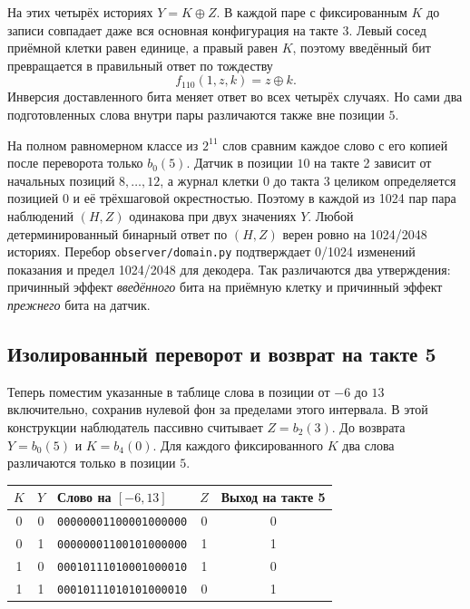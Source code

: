 На этих четырёх историях $Y=K\oplus Z$. В каждой паре с фиксированным $K$
до записи совпадает даже вся основная конфигурация на такте 3.
Левый сосед приёмной клетки равен единице, а правый равен $K$, поэтому
введённый бит превращается в правильный ответ по тождеству
\begin{equation}
 f_{110}(1,z,k)=z\oplus k.
 \label{eq:observer-xor-gate}
\end{equation}
Инверсия доставленного бита меняет ответ во всех четырёх случаях. Но сами
два подготовленных слова внутри пары различаются также вне позиции $5$.

На полном равномерном классе из $2^{11}$ слов сравним каждое слово с его
копией после переворота только $b_0(5)$. Датчик в позиции $10$ на такте 2
зависит от начальных позиций $8,\ldots,12$, а журнал клетки $0$ до такта 3
целиком определяется позицией $0$ и её трёхшаговой окрестностью.
Поэтому в каждой из 1024 пар пара наблюдений $(H,Z)$ одинакова при двух
значениях $Y$. Любой детерминированный бинарный ответ по $(H,Z)$ верен
ровно на 1024/2048 историях. Перебор \nolinkurl{observer/domain.py}
подтверждает 0/1024 изменений показания и предел 1024/2048 для декодера.
Так различаются два утверждения: причинный эффект \emph{введённого} бита
на приёмную клетку и причинный эффект \emph{прежнего} бита на датчик.

\subsection{Изолированный переворот и возврат на такте 5}
\label{sec:observer-return}

Теперь поместим указанные в таблице слова в позиции от $-6$ до $13$
включительно, сохранив нулевой фон за пределами этого интервала. В этой
конструкции наблюдатель пассивно считывает $Z=b_2(3)$. До возврата
$Y=b_0(5)$ и $K=b_4(0)$. Для каждого фиксированного $K$ два слова
различаются только в позиции $5$.

\begin{center}
\begin{tabular}{cc l cc}
$K$ & $Y$ & Слово на $[-6,13]$ & $Z$ & Выход на такте 5 \\
\hline
0 & 0 & \texttt{00000001100001000000} & 0 & 0 \\
0 & 1 & \texttt{00000001100101000000} & 1 & 1 \\
1 & 0 & \texttt{00010111010001000010} & 1 & 0 \\
1 & 1 & \texttt{00010111010101000010} & 0 & 1
\end{tabular}
\end{center}

